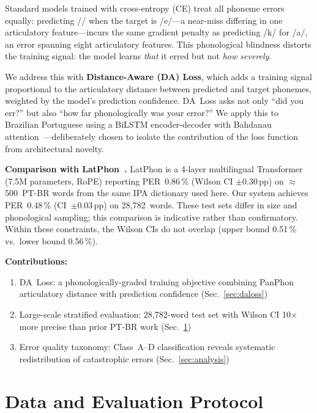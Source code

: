 \documentclass[conference]{IEEEtran}
\begin{document}
Standard models trained with cross-entropy (CE) treat all phoneme
errors equally: predicting // when the target is /e/---a
near-miss differing in one articulatory feature---incurs the same
gradient penalty as predicting /k/ for /a/, an error spanning eight
articulatory features.
This phonological blindness distorts the training signal: the model
learns \emph{that} it erred but not \emph{how severely}.

We address this with \textbf{Distance-Aware (DA) Loss}, which adds a
training signal proportional to the articulatory distance between
predicted and target phonemes, weighted by the model's prediction
confidence.
DA~Loss asks not only ``did you err?'' but also ``how far
phonologically was your error?''
We apply this to Brazilian Portuguese using a BiLSTM encoder-decoder
with Bahdanau attention~\cite{bahdanau2014neural}---deliberately
chosen to isolate the contribution of the loss function from
architectural novelty.

\textbf{Comparison with LatPhon~\cite{chary2025latphon}.}
LatPhon is a 4-layer multilingual Transformer (7.5M parameters, RoPE)
reporting PER~0.86\,\% (Wilson CI $\pm$0.30\,pp) on
$\approx$500~PT-BR words from the same IPA dictionary used here.
Our system achieves PER~0.48\,\% (CI~$\pm$0.03\,pp) on
28{,}782~words.
These test sets differ in size and phonological sampling; this
comparison is indicative rather than confirmatory.
Within these constraints, the Wilson CIs do not overlap (upper
bound 0.51\,\% vs.\ lower bound 0.56\,\%).

\textbf{Contributions:}
\begin{enumerate}
  \item DA~Loss: a phonologically-graded training objective combining
        PanPhon articulatory distance with prediction confidence
        (Sec.~\ref{sec:daloss})
  \item Large-scale stratified evaluation: 28{,}782-word test set
        with Wilson CI 10$\times$ more precise than prior PT-BR work
        (Sec.~\ref{sec:data})
  \item Error quality taxonomy: Class~A--D classification reveals
        systematic redistribution of catastrophic errors
        (Sec.~\ref{sec:analysis})
\end{enumerate}

\section{Data and Evaluation Protocol}
\label{sec:data}
\end{document}
